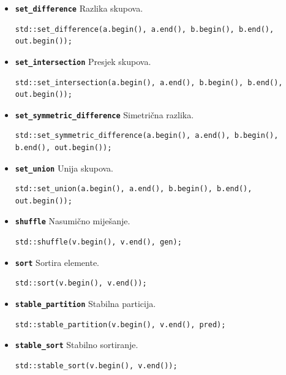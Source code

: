 \begin{itemize}
\item \textbf{\texttt{set\_difference}}\newline
Razlika skupova.
\begin{verbatim}
std::set_difference(a.begin(), a.end(), b.begin(), b.end(), out.begin());
\end{verbatim}

\item \textbf{\texttt{set\_intersection}}\newline
Presjek skupova.
\begin{verbatim}
std::set_intersection(a.begin(), a.end(), b.begin(), b.end(), out.begin());
\end{verbatim}

\item \textbf{\texttt{set\_symmetric\_difference}}\newline
Simetrična razlika.
\begin{verbatim}
std::set_symmetric_difference(a.begin(), a.end(), b.begin(), b.end(), out.begin());
\end{verbatim}

\item \textbf{\texttt{set\_union}}\newline
Unija skupova.
\begin{verbatim}
std::set_union(a.begin(), a.end(), b.begin(), b.end(), out.begin());
\end{verbatim}

\item \textbf{\texttt{shuffle}}\newline
Nasumično miješanje.
\begin{verbatim}
std::shuffle(v.begin(), v.end(), gen);
\end{verbatim}

\item \textbf{\texttt{sort}}\newline
Sortira elemente.
\begin{verbatim}
std::sort(v.begin(), v.end());
\end{verbatim}

\item \textbf{\texttt{stable\_partition}}\newline
Stabilna particija.
\begin{verbatim}
std::stable_partition(v.begin(), v.end(), pred);
\end{verbatim}

\item \textbf{\texttt{stable\_sort}}\newline
Stabilno sortiranje.
\begin{verbatim}
std::stable_sort(v.begin(), v.end());
\end{verbatim}


\end{itemize}
